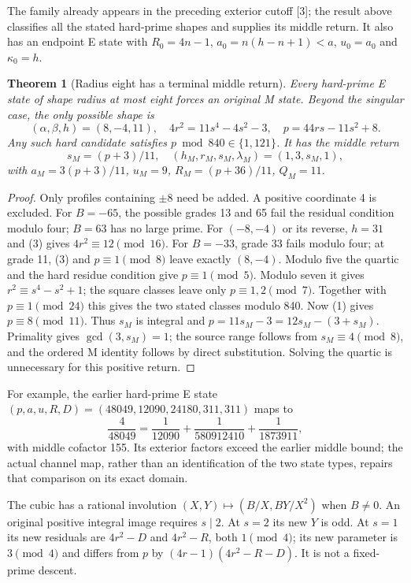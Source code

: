 \documentclass[11pt,reqno]{amsart}
\newtheorem{theorem}{Theorem}\newtheorem{lemma}[theorem]{Lemma}
\begin{document}
The family already appears in the preceding exterior cutoff [3]; the result
above classifies all the stated hard-prime shapes and supplies its middle return.
It also has an endpoint E state with $R_0=4n-1$, $a_0=n(h-n+1)<a$, $u_0=a_0$
and $\kappa_0=h$.

\begin{theorem}[Radius eight has a terminal middle return]
Every hard-prime E state of shape radius at most eight forces an original M
state. Beyond the singular case, the only possible shape is
\[
 (\alpha,\beta,h)=(8,-4,11),\quad
 4r^2=11s^4-4s^2-3,\quad p=44rs-11s^2+8.
\]
Any such hard candidate satisfies $p\bmod840\in\{1,121\}$.
It has the middle return
\[
 s_M=(p+3)/11,\quad (h_M,r_M,s_M,\lambda_M)=(1,3,s_M,1),
\]
with $a_M=3(p+3)/11$, $u_M=9$, $R_M=(p+36)/11$, $Q_M=11$.
\end{theorem}
\begin{proof}
Only profiles containing $\pm8$ need be added. A positive coordinate 4 is
excluded. For $B=-65$, the possible grades 13 and 65 fail the residual condition
modulo four; $B=63$ has no large prime. For $(-8,-4)$ or its reverse, $h=31$
and (3) gives $4r^2\equiv12\pmod{16}$. For $B=-33$, grade 33 fails modulo four;
at grade 11, (3) and $p\equiv1\pmod8$ leave exactly $(8,-4)$.
Modulo five the quartic and the hard residue condition give $p\equiv1\pmod5$.
Modulo seven it gives $r^2\equiv s^4-s^2+1$; the square classes leave only
$p\equiv1,2\pmod7$. Together with $p\equiv1\pmod{24}$ this gives the two
stated classes modulo 840.
Now (1) gives $p\equiv8\pmod{11}$. Thus $s_M$ is integral and
$p=11s_M-3=12s_M-(3+s_M)$. Primality gives $\gcd(3,s_M)=1$; the source range
follows from $s_M\equiv4\pmod8$, and the ordered M identity follows by direct
substitution. Solving the quartic is
unnecessary for this positive return.
\end{proof}

For example, the earlier hard-prime E state
$(p,a,u,R,D)=(48049,12090,24180,311,311)$ maps to
\[
 \frac4{48049}=\frac1{12090}+\frac1{580912410}+\frac1{1873911},
\]
with middle cofactor 155. Its exterior factors exceed the earlier middle bound;
the actual channel map, rather than an identification of the two state types,
repairs that comparison on its exact domain.

The cubic has a rational involution $(X,Y)\mapsto(B/X,BY/X^2)$ when $B\ne0$.
An original positive integral image requires $s\mid2$. At $s=2$ its new $Y$ is
odd. At $s=1$ its new residuals are $4r^2-D$ and $4r^2-R$, both $1\pmod4$;
its new parameter is $3\pmod4$ and differs from $p$ by
$(4r-1)(4r^2-R-D)$. It is not a fixed-prime descent.
\end{document}
